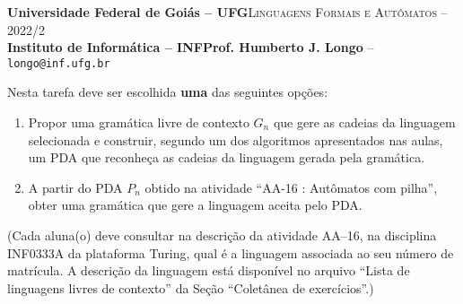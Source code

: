 \documentclass[12pt]{article}
\def\ua{17}
\def\up{16}
\begin{document}
 \begin{tcolorbox}[rounded corners, colback=blue!3, colframe=blue!40!black]
  \footnotesize\textbf{Universidade Federal de Goiás -- UFG}\hfill \textsc{Linguagens Formais e Autômatos -- 2022/2}\\
  \footnotesize\textbf{Instituto de Informática -- INF\hfill Prof. Humberto J. Longo} -- \scriptsize\texttt{longo@inf.ufg.br}
 \end{tcolorbox}\bigskip
%
\begin{tcolorbox}[rounded corners, colback=blue!2, colframe=blue!40!black, title=\textbf{Atividade AA-\ua}]
 Nesta tarefa deve ser escolhida \textbf{uma} das seguintes opções:
 \begin{enumerate}
  \item Propor uma gramática livre de contexto $G_n$ que gere as cadeias da linguagem selecionada e construir, segundo um dos algoritmos apresentados nas aulas, um PDA que reconheça as cadeias da linguagem gerada pela gramática.
  \item A partir do PDA $P_n$ obtido na atividade ``AA-16 : Autômatos com pilha'', obter uma gramática que gere a linguagem aceita pelo PDA.
 \end{enumerate}
 (Cada aluna(o) deve consultar na descrição da atividade AA--\up, na disciplina INF0333A da plataforma Turing, qual é a linguagem associada ao seu número de matrícula. A descrição da linguagem está disponível no arquivo ``Lista de linguagens livres de contexto'' da Seção ``Coletânea de exercícios''.)
\end{tcolorbox}\bigskip
\end{document}
